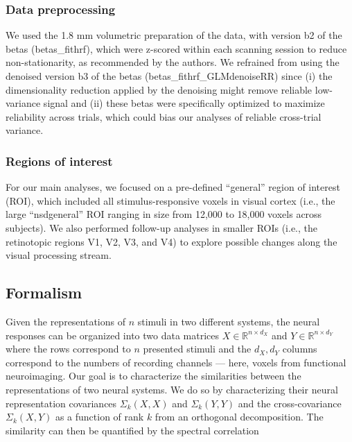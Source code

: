 \documentclass[10pt]{article}
\begin{document}
\subsubsection{Data preprocessing}\label{data-preprocessing}

We used the 1.8 mm volumetric preparation of the data, with version b2
of the betas (betas\_fithrf), which were z-scored within each scanning
session to reduce non-stationarity, as recommended by the authors. We
refrained from using the denoised version b3 of the betas
(betas\_fithrf\_GLMdenoiseRR) since (i) the dimensionality reduction
applied by the denoising might remove reliable low-variance signal and
(ii) these betas were specifically optimized to maximize reliability
across trials, which could bias our analyses of reliable cross-trial
variance.

\subsubsection{Regions of interest}\label{regions-of-interest}

For our main analyses, we focused on a pre-defined ``general'' region of
interest (ROI), which included all stimulus-responsive voxels in visual
cortex (i.e., the large ``nsdgeneral'' ROI ranging in size from 12,000
to 18,000 voxels across subjects). We also performed follow-up analyses
in smaller ROIs (i.e., the retinotopic regions V1, V2, V3, and V4) to
explore possible changes along the visual processing stream.

\subsection{Formalism}\label{formalism}

Given the representations of \(n\) stimuli in two different systems, the
neural responses can be organized into two data matrices
\(X \in \mathbb{R}^{n \times d_X}\) and
\(Y \in \mathbb{R}^{n \times d_Y}\) where the rows correspond to \(n\)
presented stimuli and the \(d_X, d_Y\) columns correspond to the numbers
of recording channels --- here, voxels from functional neuroimaging. Our
goal is to characterize the similarities between the representations of
two neural systems. We do so by characterizing their neural
representation covariances \(\Sigma_k(X, X)\) and \(\Sigma_k(Y, Y)\) and
the cross-covariance \(\Sigma_k(X, Y)\) as a function of rank \(k\) from
an orthogonal decomposition. The similarity can then be quantified by
the spectral correlation
\end{document}
